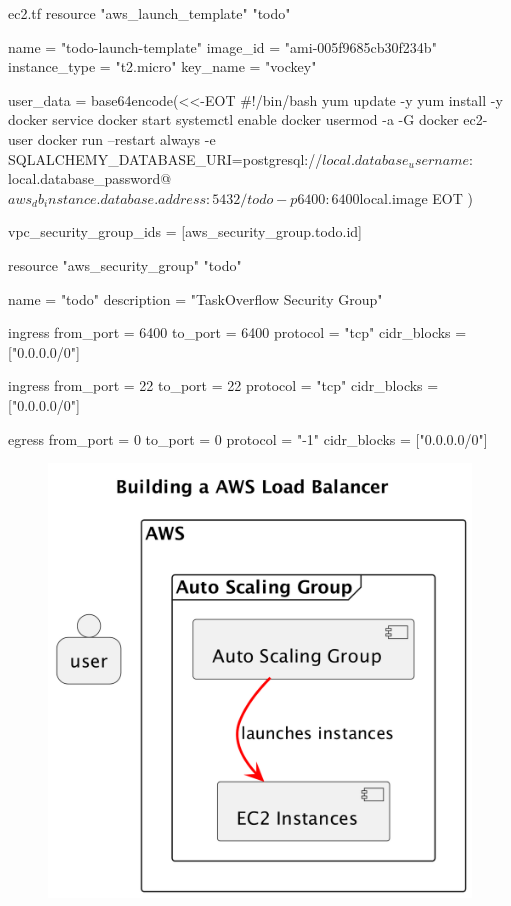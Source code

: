 \documentclass{csse4400}
\begin{document}
\begin{code}[language=terraform,numbers=none]{ec2.tf}
resource "aws_launch_template" "todo" {
  name = "todo-launch-template"
  image_id = "ami-005f9685cb30f234b"
  instance_type = "t2.micro"
  key_name = "vockey"

  user_data = base64encode(<<-EOT
    #!/bin/bash
    yum update -y
    yum install -y docker
    service docker start
    systemctl enable docker
    usermod -a -G docker ec2-user 
    docker run --restart always -e SQLALCHEMY_DATABASE_URI=postgresql://${local.database_username}:${local.database_password}@${aws_db_instance.database.address}:5432/todo -p 6400:6400 ${local.image}
EOT
  )

  vpc_security_group_ids = [aws_security_group.todo.id]
}


resource "aws_security_group" "todo" {
  name = "todo"
  description = "TaskOverflow Security Group"

  ingress {
    from_port = 6400
    to_port = 6400
    protocol = "tcp"
    cidr_blocks = ["0.0.0.0/0"]
  }

  ingress {
    from_port = 22
    to_port = 22
    protocol = "tcp"
    cidr_blocks = ["0.0.0.0/0"]
  }

  egress {
    from_port = 0
    to_port = 0
    protocol = "-1"
    cidr_blocks = ["0.0.0.0/0"]
  }
}
\end{code}


\begin{figure}[H]
  \includegraphics[width=\textwidth]{diagrams/lb1}
\end{figure}
\end{document}

